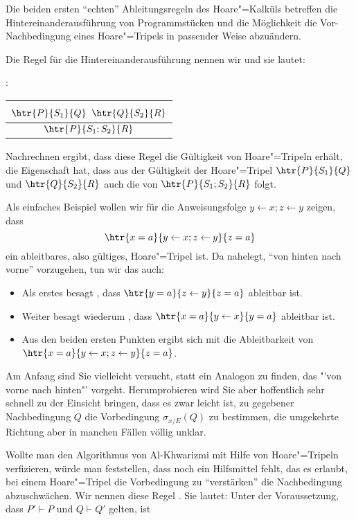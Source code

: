Die beiden ersten "`echten"' Ableitungsregeln des Hoare"=Kalküls
betreffen die Hintereinanderausführung von Programmstücken und die
Möglichkeit die Vor- \bzw Nachbedingung eines Hoare"=Tripels in
passender Weise abzuändern.

Die Regel für die Hintereinanderausführung nennen wir  und sie
lautet:

: \quad \begin{tabular}{c}
                $\htr{P}{S_1}{Q}$ \qquad $\htr{Q}{S_2}{R}$ \\
                \midrule
                $\htr{P}{S_1;S_2}{R}$ 
              \end{tabular}

\noindent
Nachrechnen ergibt, dass diese Regel die Gültigkeit von Hoare"=Tripeln
erhält, \dh die Eigenschaft hat, dass aus der Gültigkeit der
Hoare"=Tripel $\htr{P}{S_1}{Q}$ und $\htr{Q}{S_2}{R}$ auch die von
$\htr{P}{S_1;S_2}{R}$ folgt.

Als einfaches Beispiel wollen wir für die Anweisungsfolge
$y \gets x; z \gets y$  zeigen, dass
\[
\htr{x=a}{y \gets x; z \gets y}{z=a}
\]
ein ableitbares, also gültiges, Hoare"=Tripel ist.
%
Da  nahelegt, "`von hinten nach vorne"' vorzugehen, tun wir das
auch:
\begin{itemize}
\item Als erstes besagt , dass $\htr{y=a}{z\gets y}{z=a}$ ableitbar ist.
\item Weiter besagt wiederum , dass $\htr{x=a}{y\gets x}{y=a}$
  ableitbar ist.
\item Aus den beiden ersten Punkten ergibt sich mit  die Ableitbarkeit von \\
  $\htr{x=a}{y \gets x; z \gets y}{z=a}$.
\end{itemize}

Am Anfang sind Sie vielleicht versucht, statt  ein Analogon zu
finden, das "'von vorne nach hinten"' vorgeht.
%
Herumprobieren wird Sie aber hoffentlich sehr schnell zu der Einsicht
bringen, dass es zwar leicht ist, zu gegebener Nachbedingung $Q$ die
Vorbedingung $\sigma_{x/E}(Q)$ zu bestimmen, die umgekehrte Richtung
aber in manchen Fällen völlig unklar.

Wollte man \zB den Algorithmus von Al-Khwarizmi mit Hilfe von
Hoare"=Tripeln verfizieren, würde man feststellen, dass noch ein
Hilfsmittel fehlt, das es erlaubt, bei einem Hoare"=Tripel die
Vorbedingung zu "`verstärken"' \bzw die Nachbedingung abzuschwächen.
%
Wir nennen diese Regel .
%
Sie lautet:
%
Unter der Voraussetzung, dass $P' \vdash P$ und $Q \vdash Q'$ gelten, ist

